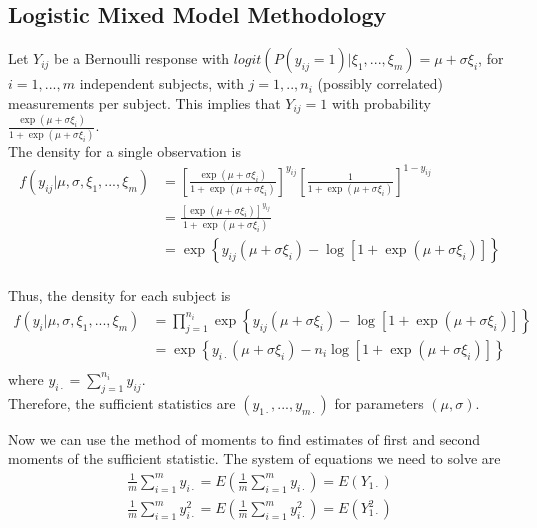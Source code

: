 \documentclass[11pt]{article}\usepackage[]{graphicx}\usepackage[]{color}
\begin{document}
\subsection{Logistic Mixed Model Methodology}

Let $Y_{ij}$ be a Bernoulli response with $logit(P(y_{ij}=1)|\xi_1,...,\xi_m)=\mu+ \sigma\xi_i$, for $i=1,...,m$ independent subjects, with $j=1,..,n_i$ (possibly correlated) measurements per subject.   This implies that $Y_{ij}=1$ with probability $\frac{\exp(\mu+\sigma\xi_i)}{1+\exp(\mu+\sigma\xi_i)}$.\\

The density for a single observation is
\begin{align*}
f(y_{ij}|\mu,\sigma,\xi_1,...,\xi_m)&=\left[\frac{\exp(\mu+\sigma\xi_i)}{1+\exp(\mu+\sigma\xi_i)}\right]^{y_{ij}}\left[\frac{1}{1+\exp(\mu+\sigma\xi_i)}\right]^{1-y_{ij}}\\
&=\frac{\left[\exp(\mu+\sigma\xi_i)\right]^{y_{ij}}}{1+\exp(\mu+\sigma\xi_i)}\\
&=\exp\left\{{y_{ij}}(\mu+\sigma\xi_i)-\log[1+\exp(\mu+\sigma\xi_i)]\right\}\\
\end{align*}

Thus, the density for each subject is 
\begin{align*}
f(y_i|\mu,\sigma,\xi_1,...,\xi_m)&=\prod_{j=1}^{n_i}\exp\left\{{y_{ij}}(\mu+\sigma\xi_i)-\log[1+\exp(\mu+\sigma\xi_i)]\right\}\\
&=\exp\left\{{y_{i\cdot}}(\mu+\sigma\xi_i)-n_i\log[1+\exp(\mu+\sigma\xi_i)]\right\}\\
\end{align*}
where $y_{i\cdot}=\sum_{j=1}^{n_i}{y_{ij}}$.\\

Therefore, the sufficient statistics are $(y_{1\cdot},...,y_{m\cdot})$ for parameters $(\mu,\sigma)$. 

Now we can use the method of moments to find estimates of first and second moments of the sufficient statistic.  The system of equations we need to solve are 
\begin{align*}
\frac{1}{m}\sum_{i=1}^m y_{i\cdot}=E\left(\frac{1}{m}\sum_{i=1}^m y_{i\cdot}\right)=E(Y_{1\cdot})\\
\frac{1}{m}\sum_{i=1}^m y_{i\cdot}^2=E\left(\frac{1}{m}\sum_{i=1}^m y_{i\cdot}^2\right)=E(Y_{1\cdot}^2) 
\end{align*}
\end{document}
